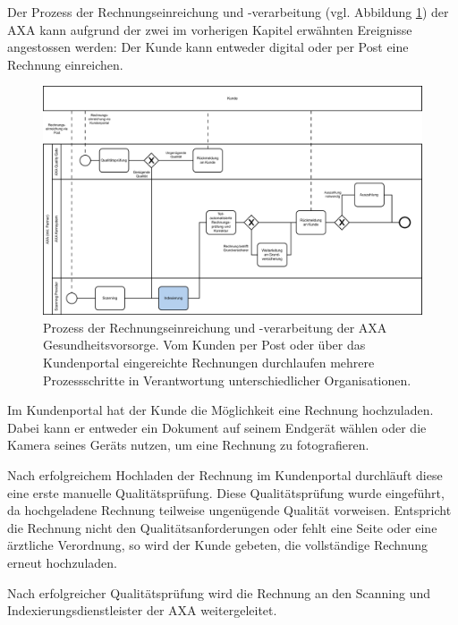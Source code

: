 Der Prozess der Rechnungseinreichung und -verarbeitung (vgl. Abbildung \ref{prozessaxa}) der AXA kann aufgrund der zwei im vorherigen Kapitel erwähnten Ereignisse angestossen werden: Der Kunde kann entweder digital oder per Post eine Rechnung einreichen. 

\begin{figure}[h]
    \captionsetup{width=.8\linewidth}
    \caption{Prozess der Rechnungseinreichung und -verarbeitung der AXA Gesundheitsvorsorge. Vom Kunden per Post oder über das Kundenportal eingereichte Rechnungen durchlaufen mehrere Prozessschritte in Verantwortung unterschiedlicher Organisationen.}
    \label{prozessaxa}
    \centering
    \vspace{0.2cm}
    \includegraphics[width=\textwidth]{graphics/rechnungseinreichung-bpmn.pdf}
\end{figure}


Im Kundenportal hat der Kunde die Möglichkeit eine Rechnung hochzuladen. Dabei kann er entweder ein Dokument auf seinem Endgerät wählen oder die Kamera seines Geräts nutzen, um eine Rechnung zu fotografieren.

Nach erfolgreichem Hochladen der Rechnung im Kundenportal durchläuft diese eine erste manuelle Qualitätsprüfung. Diese Qualitätsprüfung wurde eingeführt, da hochgeladene Rechnung teilweise ungenügende Qualität vorweisen. Entspricht die Rechnung nicht den Qualitätsanforderungen oder fehlt eine Seite oder eine ärztliche Verordnung, so wird der Kunde gebeten, die vollständige Rechnung erneut hochzuladen.

Nach erfolgreicher Qualitätsprüfung wird die Rechnung an den Scanning und Indexierungsdienstleister der AXA weitergeleitet.

